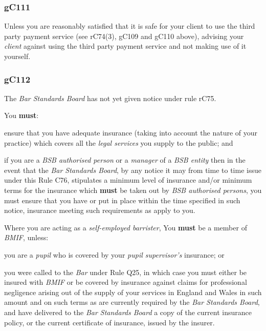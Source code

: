\subsubsection{\color{darkgrey}gC111}

Unless you are reasonably satisfied that it is safe for your client to
use the third party payment service (see rC74(3), gC109 and gC110 above),
advising your \emph{client} against using the third party payment
service and not making use of it yourself.

\subsubsection{\color{darkgrey}gC112}

The \emph{Bar Standards Board} has not yet given notice under rule rC75.




You \textcolor{myred}{\textbf{must}}:
\begin{numlist}
\item ensure that you have adequate insurance (taking into account the
nature of your practice) which covers all the \emph{legal services} you
supply to the public; and

\item if you are a \emph{BSB authorised person} or a \emph{manager} of a
\emph{BSB entity} then in the event that the \emph{Bar Standards Board},
by any notice it may from time to time issue under this Rule C76,
stipulates a minimum level of insurance and/or minimum terms for the
insurance which \textcolor{myred}{\textbf{must}} be taken out by \emph{BSB authorised persons}, you
must ensure that you have or put in place within the time specified in
such notice, insurance meeting such requirements as apply to you.
\end{numlist}

Where you are acting as a \emph{self-employed barrister}, You \textcolor{myred}{\textbf{must}} be a
member of \emph{BMIF}, unless:

\begin{numlist}\item you are a \emph{pupil} who is covered by your \emph{pupil
supervisor's} insurance; or

\item you were called to the \emph{Bar} under Rule Q25, in which case you
must either be insured with \emph{BMIF} or be covered by insurance
against claims for professional negligence arising out of the supply of
your services in England and Wales in such amount and on such terms as
are currently required by the \emph{Bar Standards Board}, and have
delivered to the \emph{Bar Standards Board} a copy of the current
insurance policy, or the current certificate of insurance, issued by the
insurer.
\end{numlist}

